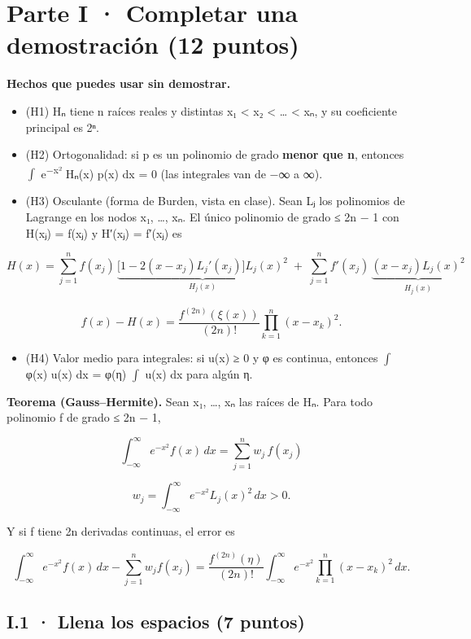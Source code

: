 \section{Parte I · Completar una demostración (12 puntos)}

\textbf{Hechos que puedes usar sin demostrar.}

\begin{itemize}
\tightlist
\item
  (H1) Hₙ tiene n raíces reales y distintas x₁ \textless{} x₂ \textless{} \ldots{} \textless{} xₙ, y su coeficiente principal es 2ⁿ.
\item
  (H2) Ortogonalidad: si p es un polinomio de grado \textbf{menor que n}, entonces \ensuremath{\int} e\textsuperscript{−x²} Hₙ(x) p(x) dx = 0 (las integrales van de −∞ a ∞).
\item
  (H3) Osculante (forma de Burden, vista en clase). Sean Lⱼ los polinomios de Lagrange en los nodos x₁, \ldots, xₙ. El único polinomio de grado ≤ 2n − 1 con H(xⱼ) = f(xⱼ) y H′(xⱼ) = f′(xⱼ) es
\end{itemize}

\[H(x)=\sum_{j=1}^{n} f(x_j)\,\underbrace{\big[1-2(x-x_j)L_j'(x_j)\big]L_j(x)^2}_{H_j(x)}\;+\;\sum_{j=1}^{n} f'(x_j)\,\underbrace{(x-x_j)L_j(x)^2}_{\hat H_j(x)}\]

\[f(x)-H(x)=\frac{f^{(2n)}(\xi(x))}{(2n)!}\prod_{k=1}^{n}(x-x_k)^2 .\]

\begin{itemize}
\tightlist
\item
  (H4) Valor medio para integrales: si u(x) ≥ 0 y φ es continua, entonces \ensuremath{\int} φ(x) u(x) dx = φ(η) \ensuremath{\int} u(x) dx para algún η.
\end{itemize}

\textbf{Teorema (Gauss--Hermite).} Sean x₁, \ldots, xₙ las raíces de Hₙ. Para todo polinomio f de grado ≤ 2n − 1,

\[\int_{-\infty}^{\infty} e^{-x^2} f(x)\,dx=\sum_{j=1}^{n} w_j\,f(x_j)\]

\[w_j=\int_{-\infty}^{\infty} e^{-x^2}L_j(x)^2\,dx>0 .\]

Y si f tiene 2n derivadas continuas, el error es

\[\int_{-\infty}^{\infty} e^{-x^2} f(x)\,dx-\sum_{j=1}^{n} w_j f(x_j)=\frac{f^{(2n)}(\eta)}{(2n)!}\int_{-\infty}^{\infty} e^{-x^2}\prod_{k=1}^{n}(x-x_k)^2\,dx .\]

\subsection{I.1 · Llena los espacios (7 puntos)}

